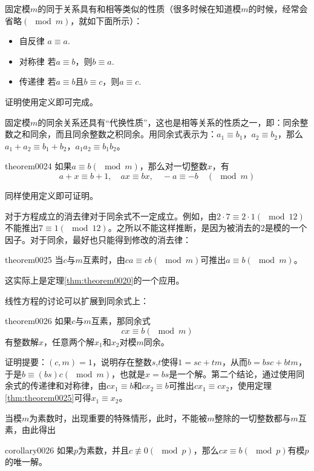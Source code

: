 固定模$m$的同于关系具有和相等类似的性质（很多时候在知道模$m$的时候，经常会省略$(\mod{m})$，就如下面所示）：
\begin{itemize}
\item 自反律 $a \equiv a$.
\item 对称律 若$a \equiv b$，则$b \equiv a$.
\item 传递律 若$a \equiv b$且$b \equiv c$，则$a \equiv c$.
\end{itemize}
证明使用定义即可完成。

固定模$m$的同余关系还具有“代换性质”，这也是相等关系的性质之一，即：同余整数之和同余，而且同余整数之积同余。用同余式表示为：$a_1 \equiv b_1$，$a_2 \equiv b_2$，那么$a_1+a_2 \equiv b_1+b_2$，$a_1a_2 \equiv b_1b_2$。
\begin{theorem}{}{theorem0024}
如果$a \equiv b(\mod{m})$，那么对一切整数$x$，有
\[
a+x \equiv b+1, \quad ax \equiv bx, \quad  -a \equiv -b \quad (\mod{m})
\]
\end{theorem}

同样使用定义即可证明。

对于方程成立的消去律对于同余式不一定成立。例如，由$2 \cdot 7 \equiv 2 \cdot 1(\mod{12})$不能推出$7 \equiv 1(\mod{12})$。之所以不能这样推断，是因为被消去的$2$是模的一个因子。对于同余，最好也只能得到修改的消去律：
\begin{theorem}{}{theorem0025}
当$c$与$m$互素时，由$ca \equiv cb(\mod{m})$可推出$a \equiv b(\mod{m})$。
\end{theorem}

这实际上是定理\ref{thm:theorem0020}的一个应用。

线性方程的讨论可以扩展到同余式上：
\begin{theorem}{}{theorem0026}
如果$c$与$m$互素，那同余式
\[
cx \equiv b(\mod{m})
\]
有整数解$x$，任意两个解$x_1$和$x_2$对模$m$同余。
\end{theorem}

证明提要：$(c,m)=1$，说明存在整数$s$,$t$使得$1 = sc+tm$，从而$b = bsc + btm$，于是$b \equiv (bs)c(\mod{m})$，也就是$x=bs$是一个解。第二个结论，通过使用同余式的传递律和对称律，由$cx_1 \equiv b$和$cx_2 \equiv b$可推出$cx_1 \equiv cx_2$，使用定理\ref{thm:theorem0025}可得$x_1 \equiv x_2$。

当模$m$为素数时，出现重要的特殊情形，此时，不能被$m$整除的一切整数都与$m$互素，由此得出
\begin{corollary}{}{corollary0026}
如果$p$为素数，并且$c \not\equiv 0(\mod{p})$，那么$cx \equiv b(\mod{p})$有模$p$的唯一解。
\end{corollary}

